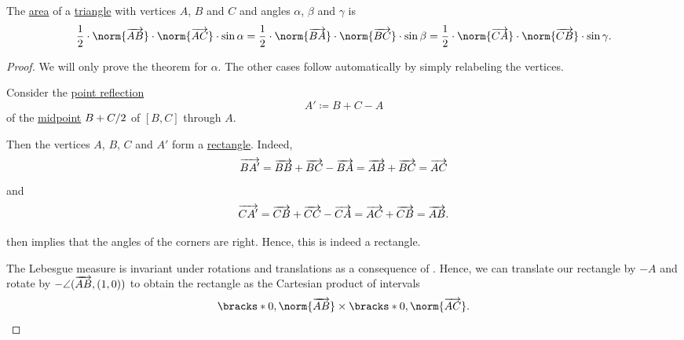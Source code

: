 \begin{proposition}\label{thm:area_of_triangle}
  The \hyperref[def:figure_area]{area} of a \hyperref[def:triangle]{triangle} with vertices \( A \), \( B \) and \( C \) and angles \( \alpha \), \( \beta \) and \( \gamma \) is
  \begin{equation}\label{eq:thm:area_of_triangle}
    \frac 1 2 \cdot \norm{\vect{AB}} \cdot \norm{\vect{AC}} \cdot \sin \alpha = \frac 1 2 \cdot \norm{\vect{BA}} \cdot \norm{\vect{BC}} \cdot \sin \beta = \frac 1 2 \cdot \norm{\vect{CA}} \cdot \norm{\vect{CB}} \cdot \sin \gamma.
  \end{equation}
\end{proposition}
\begin{proof}
  We will only prove the theorem for \( \alpha \). The other cases follow automatically by simply relabeling the vertices.

   Consider the \hyperref[def:rigid_motion/point_reflection]{point reflection}
  \begin{equation*}
    A' \coloneqq B + C - A
  \end{equation*}
  of the \hyperref[thm:segment_midpoint]{midpoint} \( \ifrac {B + C} 2 \) of \( [B, C] \) through \( A \).

  Then the vertices \( A \), \( B \), \( C \) and \( A' \) form a \hyperref[def:parallelogram/rectangle]{rectangle}. Indeed,
  \begin{equation*}
    \overrightarrow{BA'} = \overrightarrow{BB} + \overrightarrow{BC} - \overrightarrow{BA} = \overrightarrow{AB} + \overrightarrow{BC} = \overrightarrow{AC}
  \end{equation*}
  and
  \begin{equation*}
    \overrightarrow{CA'} = \overrightarrow{CB} + \overrightarrow{CC} - \overrightarrow{CA} = \overrightarrow{AC} + \overrightarrow{CB} = \overrightarrow{AB}.
  \end{equation*}

   then implies that the angles of the corners are right. Hence, this is indeed a rectangle.

  The Lebesgue measure is invariant under rotations and translations as a consequence of . Hence, we can translate our rectangle by \( -A \) and rotate by \( -\angle(\overrightarrow{AB}, (1, 0)) \) to obtain the rectangle as the Cartesian product of intervals
  \begin{equation*}
    \bracks*{ 0, \norm{\vect{AB}} } \times \bracks*{ 0, \norm{\vect{AC}} }.
  \end{equation*}


\end{proof}

